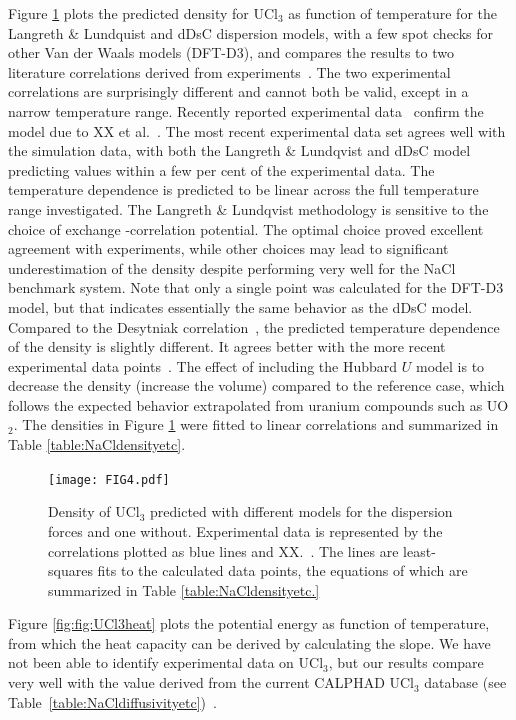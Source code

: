 \documentclass[preprint,3p,10pt,twocolumn,number,sort&compress]{elsarticle}
\begin{document}
Figure \ref{fig:UCl3density} plots the predicted density for UCl$_3$ as function of temperature for the Langreth \& Lundquist and dDsC dispersion models, with a few spot checks for other Van der Waals models (DFT-D3), and compares the results to two literature correlations derived from experiments~\cite{}. The two experimental correlations are surprisingly different and cannot both be valid, except in a narrow temperature range. Recently reported experimental data~\cite{} confirm the model due to XX et al.~\cite{}. The most recent experimental data set agrees well with the simulation data, with both the Langreth \& Lundqvist and dDsC model predicting values within a few per cent of the experimental data. The temperature dependence is predicted to be linear across the full temperature range investigated. The Langreth \& Lundqvist methodology is sensitive to the choice of exchange -correlation potential. The optimal choice proved excellent agreement with experiments, while other choices may lead to significant underestimation of the density despite performing very well for the NaCl benchmark system. Note that only a single point was calculated for the DFT-D3 model, but that indicates essentially the same behavior as the dDsC model.  Compared to the Desytniak correlation~\cite{},  the predicted temperature dependence of the density is slightly different. It agrees better with the more recent experimental data points~\cite{XX}. The effect of including the Hubbard $U$  model is to decrease the density (increase the volume) compared to the reference case, which follows the expected behavior extrapolated from uranium compounds such as UO$_2$. The densities in Figure \ref{fig:UCl3density} were fitted to linear correlations and summarized in Table \ref{table:NaCldensityetc}.


\begin{figure}[htb]
\centering
\texttt{[image: FIG4.pdf]}
\caption{Density of UCl$_3$ predicted with different models for the dispersion forces and one without. Experimental data is represented by the correlations plotted as blue lines and XX.~\cite{}. The lines are least-squares fits to the calculated data points, the equations of which are summarized in Table \ref{table:NaCldensityetc.}} 
\label{fig:UCl3density}
\end{figure}

 
Figure \ref{fig:fig:UCl3heat} plots the potential energy as function of temperature, from which the heat capacity can be derived by calculating the slope. We have not been able to identify experimental data on UCl$_3$, but our results compare very well with the value derived from the current CALPHAD UCl$_3$ database (see Table~\ref{table:NaCldiffusivityetc})~\cite{}.
\end{document}
